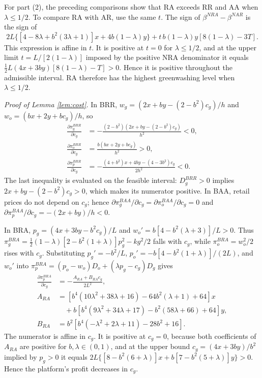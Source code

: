 \documentclass[preprint,review,12pt,authoryear,nopreprintline]{elsarticle}
\theoremstyle{definition}
\begin{document}
For part (2), the preceding comparisons show that RA exceeds RR and AA when $\lambda\leq1/2$. To compare RA with AR, use the same $t$. The sign of $\beta^{NRA}-\beta^{NAR}$ is the sign of
\[
2L\{[4-8\lambda+b^2(3\lambda+1)]x+4b(1-\lambda)y\}
+t\,b(1-\lambda)y[8(1-\lambda)-3T].
\]
This expression is affine in $t$. It is positive at $t=0$ for $\lambda\leq1/2$, and at the upper limit $t=L/[2(1-\lambda)]$ imposed by the positive NRA denominator it equals $\frac12L(4x+3by)[8(1-\lambda)-T]>0$. Hence it is positive throughout the admissible interval. RA therefore has the highest greenwashing level when $\lambda\leq1/2$.

\noindent \textit{Proof of Lemma \ref{lem:cost}.}
In BRR, $w_g=(2x+by-(2-b^2)c_g)/h$ and $w_o=(bx+2y+bc_g)/h$, so
\begin{align*}
\frac{\partial\pi_g^{BRR}}{\partial c_g}&=-\frac{(2-b^2)(2x+by-(2-b^2)c_g)}{h^2}<0,\\
\frac{\partial\pi_o^{BRR}}{\partial c_g}&=\frac{b(bx+2y+bc_g)}{h^2}>0,\\
\frac{\partial\pi_p^{BRR}}{\partial c_g}&=-\frac{(4+b^2)x+4by-(4-3b^2)c_g}{2h^2}<0.
\end{align*}
The last inequality is evaluated on the feasible interval: $D_g^{BRR}>0$ implies $2x+by-(2-b^2)c_g>0$, which makes its numerator positive. In BAA, retail prices do not depend on $c_g$; hence $\partial\pi_g^{BAA}/\partial c_g=\partial\pi_o^{BAA}/\partial c_g=0$ and $\partial\pi_p^{BAA}/\partial c_g=-(2x+by)/h<0$.

In BRA, $p_g=(4x+3by-b^2c_g)/L$ and $w_o'=b[4-b^2(\lambda+3)]/L>0$. Thus $\pi_g^{BRA}=\frac12(1-\lambda)[2-b^2(1+\lambda)]p_g^2-kg^2/2$ falls with $c_g$, while $\pi_o^{BRA}=w_o^2/2$ rises with $c_g$. Substituting $p_g'=-b^2/L$, $p_o'=-b[4-b^2(1+\lambda)]/(2L)$, and $w_o'$ into $\pi_p^{BRA}=(p_o-w_o)D_o+(\lambda p_g-c_g)D_g$ gives
\begin{align*}
\frac{\partial\pi_p^{BRA}}{\partial c_g}&=-\frac{A_{RA}+B_{RA}c_g}{2L^2},\\
A_{RA}&=[b^4(10\lambda^2+38\lambda+16)-64b^2(\lambda+1)+64]x\\
&\quad+b[b^4(9\lambda^2+34\lambda+17)-b^2(58\lambda+66)+64]y,\\
B_{RA}&=b^2[b^4(-\lambda^2+2\lambda+11)-28b^2+16].
\end{align*}
The numerator is affine in $c_g$. It is positive at $c_g=0$, because both coefficients of $A_{RA}$ are positive for $b,\lambda\in(0,1)$, and at the upper bound $c_g=(4x+3by)/b^2$ implied by $p_g>0$ it equals $2L\{[8-b^2(6+\lambda)]x+b[7-b^2(5+\lambda)]y\}>0$. Hence the platform's profit decreases in $c_g$.
\end{document}
